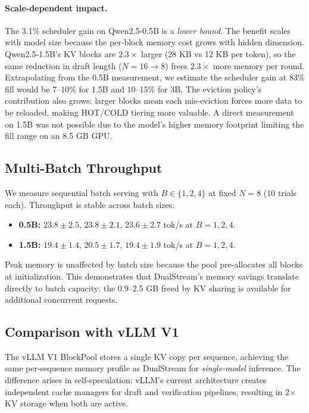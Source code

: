 \documentclass[review]{elsarticle}
\theoremstyle{definition}
\theoremstyle{remark}
\begin{document}
\paragraph{Scale-dependent impact.}
The 3.1\% scheduler gain on Qwen2.5-0.5B is a \emph{lower bound}. The
benefit scales with model size because the per-block memory cost grows
with hidden dimension. Qwen2.5-1.5B's KV blocks are $2.3\times$ larger
(28 KB vs 12 KB per token), so the same reduction in draft length
($N=16 \to 8$) frees $2.3\times$ more memory per round. Extrapolating
from the 0.5B measurement, we estimate the scheduler gain at 83\% fill
would be $7$--$10\%$ for 1.5B and $10$--$15\%$ for 3B. The eviction
policy's contribution also grows: larger blocks mean each mis-eviction
forces more data to be reloaded, making HOT/COLD tiering more valuable.
A direct measurement on 1.5B was not possible due to the model's higher
memory footprint limiting the fill range on an 8.5 GB GPU.

\subsection{Multi-Batch Throughput}

We measure sequential batch serving with $B \in \{1, 2, 4\}$ at fixed
$N=8$ (10 trials each). Throughput is stable across batch sizes:

\begin{itemize}
    \item \textbf{0.5B:} $23.8 \pm 2.5$, $23.8 \pm 2.1$, $23.6 \pm 2.7$
    tok/s at $B=1, 2, 4$.
    \item \textbf{1.5B:} $19.4 \pm 1.4$, $20.5 \pm 1.7$, $19.4 \pm 1.9$
    tok/s at $B=1, 2, 4$.
\end{itemize}

Peak memory is unaffected by batch size because the pool pre-allocates all
blocks at initialization. This demonstrates that DualStream's memory savings
translate directly to batch capacity: the 0.9--2.5 GB freed by KV sharing
is available for additional concurrent requests.

\subsection{Comparison with vLLM V1}

The vLLM V1 BlockPool stores a single KV copy per sequence, achieving the
same per-sequence memory profile as DualStream for \emph{single-model}
inference. The difference arises in self-speculation: vLLM's current
architecture creates independent cache managers for draft and verification
pipelines, resulting in 2$\times$ KV storage when both are active.
\end{document}
